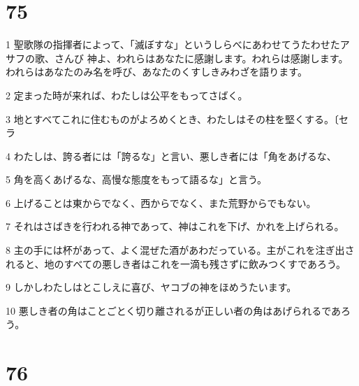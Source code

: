 \chapter{75}

\par 1 聖歌隊の指揮者によって、「滅ぼすな」というしらべにあわせてうたわせたアサフの歌、さんび 神よ、われらはあなたに感謝します。われらは感謝します。われらはあなたのみ名を呼び、あなたのくすしきみわざを語ります。
\par 2 定まった時が来れば、わたしは公平をもってさばく。
\par 3 地とすべてこれに住むものがよろめくとき、わたしはその柱を堅くする。〔セラ
\par 4 わたしは、誇る者には「誇るな」と言い、悪しき者には「角をあげるな、
\par 5 角を高くあげるな、高慢な態度をもって語るな」と言う。
\par 6 上げることは東からでなく、西からでなく、また荒野からでもない。
\par 7 それはさばきを行われる神であって、神はこれを下げ、かれを上げられる。
\par 8 主の手には杯があって、よく混ぜた酒があわだっている。主がこれを注ぎ出されると、地のすべての悪しき者はこれを一滴も残さずに飲みつくすであろう。
\par 9 しかしわたしはとこしえに喜び、ヤコブの神をほめうたいます。
\par 10 悪しき者の角はことごとく切り離されるが正しい者の角はあげられるであろう。

\chapter{76}

